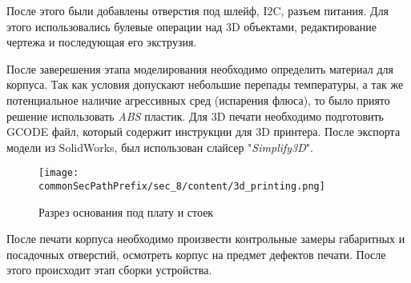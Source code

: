После этого были добавлены отверстия под шлейф, I2C, разъем питания. Для этого использовались булевые операции над 3D объектами, редактирование чертежа и последующая его экструзия.

После заверешения этапа моделирования необходимо определить материал для корпуса. Так как условия допускают небольшие перепады температуры, а так же потенциальное наличие агрессивных сред (испарения флюса), то было приято решение использовать \textit{ABS} пластик. Для 3D печати необходимо подготовить GCODE файл, который содержит инструкции для 3D принтера. После экспорта модели из SolidWorks, был использован слайсер "\textit{Simplify3D}".
\begin{figure}[ht]
    \centering
    \texttt{[image: \\commonSecPathPrefix/sec\_8/content/3d\_printing.png]}
    \caption{Разрез основания под плату и стоек}
\end{figure}

После печати корпуса необходимо произвести контрольные замеры габаритных и посадочных отверстий, осмотреть корпус на предмет дефектов печати. После этого происходит этап сборки устройства.